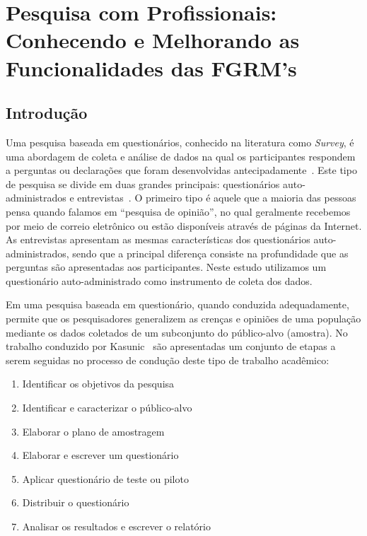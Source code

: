 \chapter{Pesquisa com Profissionais: Conhecendo e Melhorando as Funcionalidades
das FGRM's}
\label{ch:pesquisa-profissionais}

\section{Introdução}
\label{sec:pesquisa-profissionais-intro}

Uma pesquisa baseada em questionários, conhecido na literatura como
\textit{Survey}, é uma abordagem de coleta e análise de dados na qual os
participantes respondem a perguntas ou declarações que foram desenvolvidas
antecipadamente~\cite{kasunic2005designing}. Este tipo de pesquisa se divide em
duas grandes principais: questionários auto-administrados e
entrevistas~\cite{kasunic2005designing}. O primeiro tipo é aquele que  a maioria
das pessoas pensa quando falamos em  ``pesquisa de opinião'', no qual geralmente
recebemos por meio de correio eletrônico ou estão disponíveis através de páginas
da Internet. As entrevistas apresentam as mesmas características dos
questionários auto-administrados, sendo que a principal diferença consiste na
profundidade que as perguntas são apresentadas aos participantes.  Neste estudo
utilizamos um questionário auto-administrado como instrumento de coleta dos
dados.

Em uma pesquisa baseada em questionário, quando conduzida adequadamente, permite
que os pesquisadores generalizem as crenças e opiniões de uma população mediante
os dados coletados de um subconjunto do público-alvo (amostra). No trabalho
conduzido por Kasunic~\cite{kasunic2005designing} são apresentadas um conjunto
de etapas a serem seguidas no processo de condução deste tipo de trabalho
acadêmico:

\begin{enumerate}
\item{Identificar os objetivos da pesquisa}
\item{Identificar e caracterizar o público-alvo}
\item{Elaborar o plano de amostragem}
\item{Elaborar e escrever um questionário}
\item{Aplicar questionário de teste ou piloto}
\item{Distribuir o questionário}
\item{Analisar os resultados e escrever o relatório}
\end{enumerate}

